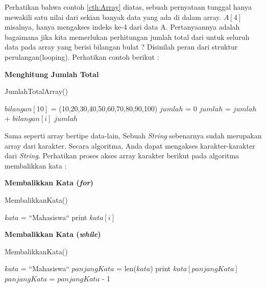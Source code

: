 \begin{enumerate}
Perhatikan bahwa contoh \ref{cth:Array} diatas, sebuah pernyataan tunggal hanya mewakili satu nilai dari sekian banyak data yang ada di dalam array. $A[4]$ misalnya, hanya mengakses indeks ke-4 dari data A. Pertanyaannya adalah bagaimana jika kita memerlukan perhitungan jumlah total dari untuk seluruh data pada array yang berisi bilangan bulat ? Disinilah peran dari struktur perulangan(looping). Perhatikan contoh berikut : 

 \begin{contoh}
	\textbf{Menghitung Jumlah Total}
	\begin{algorithm}
	\caption{JumlahTotalArray()}
		\begin{algorithmic}[1]
		\STATE $bilangan[10]$ = (10,20,30,40,50,60,70,80,90,100)
		\STATE $jumlah$ = 0
		  \STATE $jumlah$ = $jumlah$ + $bilangan[i]$
		\ENDFOR
			\STATE $jumlah$
		\end{algorithmic}
	\end{algorithm}
\end{contoh}

Sama seperti array bertipe data-lain, Sebuah \textit{String} sebenarnya sudah merupakan array dari karakter. Secara algoritma, Anda dapat mengakses karakter-karakter dari \textit{String}. Perhatikan proses akses array karakter berikut pada algoritma membalikkan kata : 

\begin{contoh}
	\textbf{Membalikkan Kata (\textit{for})}
	\begin{algorithm}
	\caption{MembalikkanKata()}
		\begin{algorithmic}[1]
		\STATE $kata$ = ``Mahasiswa``
		\FOR{$i=len(kata)$-1 \TO 0}
		  \STATE print $kata[i]$
		\ENDFOR
		\end{algorithmic}
	\end{algorithm}
\end{contoh}


\begin{contoh}
	\textbf{Membalikkan Kata (\textit{while})}
	\begin{algorithm}
	\caption{MembalikkanKata()}
		\begin{algorithmic}[1]
		\STATE $kata$ = ``Mahasiswa``
		\STATE $panjangKata$ = len($kata$)
		\WHILE{$panjangKata>0$}
		  \STATE print $kata[panjangKata]$
			\STATE $panjangKata$ = $panjangKata$ - 1
		\ENDWHILE
		\end{algorithmic}
	\end{algorithm}
\end{contoh}


\end{enumerate}

